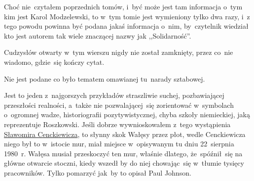 \documentclass[a4paper,11pt]{article}
\begin{document}
\start {} Choć nie~czytałem poprzednich tomów, i~być może jest
tam informacja o~tym kim jest Karol Modzelewski, to w~tym tomie jest
wymieniony tylko dwa razy, i~z tego powodu powinna być podana jakaś
informacja o~nim, by~czytelnik wiedział kto jest autorem tak wiele
znaczącej nazwy jak ,,Solidarność''.

\vspace{\spaceFour}


\start {} Cudzysłów otwarty w~tym wierszu nigdy nie został
zamknięty, przez co~nie wiadomo, gdzie~się kończy cytat.

\vspace{\spaceFour}


\start {} Nie jest podane co było tematem omawianej
tu~narady sztabowej.



\vspace{\spaceTwo}








\start {} Jest to jeden z~najgorszych przykładów straszliwie
suchej, pozbawiającej przeszłości realności, a~także nie
pozwalającej~się zorientować w~symbolach o~ogromnej wadze,
historiografii pozytywistycznej, chyba szkoły niemieckiej, jaką
reprezentuje Roszkowski. Jeśli dobrze wywnioskowałem z~tego
wystąpienia
\href{https://www.youtube.com/watch?v=6B93_3CCMac}{Sławomira
  Cenckiewicza}, to słynny skok Wałęsy przez płot, wedle Cenckiewicza
niego był to w~istocie mur, miał miejsce w~opisywanym tu dniu
22~sierpnia 1980~r. Wałęsa musiał przeskoczyć ten mur, właśnie
dlatego, że~spóźnił~się na główne otwarcie stoczni, kiedy wszedł by do
niej chowając~się w~tłumie tysięcy pracowników. Tylko pomarzyć jak~by
to opisał Paul Johnson.
\end{document}
